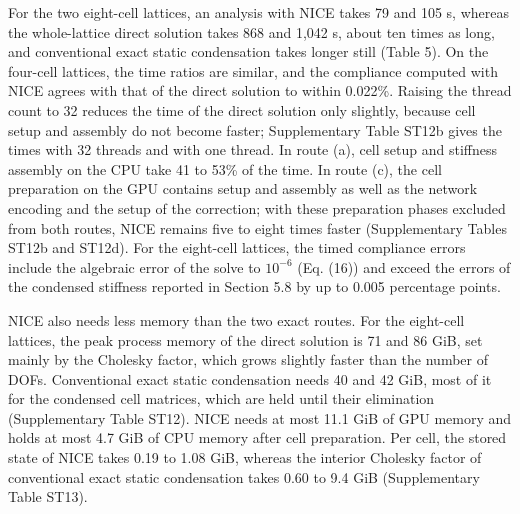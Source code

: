 \documentclass[preprint,12pt,authoryear]{elsarticle}
\begin{document}
For the two eight-cell lattices, an analysis with NICE takes 79 and 105 s, whereas the whole-lattice direct solution takes 868 and 1,042 s, about ten times as long, and conventional exact static condensation takes longer still (Table 5). On the four-cell lattices, the time ratios are similar, and the compliance computed with NICE agrees with that of the direct solution to within 0.022\%. Raising the thread count to 32 reduces the time of the direct solution only slightly, because cell setup and assembly do not become faster; Supplementary Table ST12b gives the times with 32 threads and with one thread. In route (a), cell setup and stiffness assembly on the CPU take 41 to 53\% of the time. In route (c), the cell preparation on the GPU contains setup and assembly as well as the network encoding and the setup of the correction; with these preparation phases excluded from both routes, NICE remains five to eight times faster (Supplementary Tables ST12b and ST12d). For the eight-cell lattices, the timed compliance errors include the algebraic error of the solve to \(10^{-6}\) (Eq. (16)) and exceed the errors of the condensed stiffness reported in Section 5.8 by up to 0.005 percentage points.

NICE also needs less memory than the two exact routes. For the eight-cell lattices, the peak process memory of the direct solution is 71 and 86 GiB, set mainly by the Cholesky factor, which grows slightly faster than the number of DOFs. Conventional exact static condensation needs 40 and 42 GiB, most of it for the condensed cell matrices, which are held until their elimination (Supplementary Table ST12). NICE needs at most 11.1 GiB of GPU memory and holds at most 4.7 GiB of CPU memory after cell preparation. Per cell, the stored state of NICE takes 0.19 to 1.08 GiB, whereas the interior Cholesky factor of conventional exact static condensation takes 0.60 to 9.4 GiB (Supplementary Table ST13).
\end{document}
